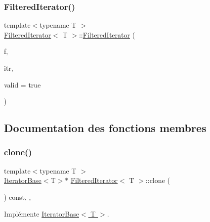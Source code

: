 \subsubsection{\texorpdfstring{Filtered\+Iterator()}{FilteredIterator()}}
{\footnotesize\ttfamily template$<$typename T $>$ \\
\hyperlink{class_filtered_iterator}{Filtered\+Iterator}$<$ T $>$\+::\hyperlink{class_filtered_iterator}{Filtered\+Iterator} (\begin{DoxyParamCaption}\item[{\hyperlink{class_filtered_collection}{Filtered\+Collection}$<$ T $>$ \&}]{f,  }\item[{\hyperlink{class_collection_iterator}{Collection\+Iterator}$<$ T $>$}]{itr,  }\item[{bool}]{valid = {\ttfamily true} }\end{DoxyParamCaption})\hspace{0.3cm}{\ttfamily [inline]}}



\subsection{Documentation des fonctions membres}
\mbox{\label{class_filtered_iterator_a79d512a43aa4d31caf26908e93130b9d}} 
\subsubsection{\texorpdfstring{clone()}{clone()}}
{\footnotesize\ttfamily template$<$typename T $>$ \\
\hyperlink{class_iterator_base}{Iterator\+Base}$<$T$>$$\ast$ \hyperlink{class_filtered_iterator}{Filtered\+Iterator}$<$ T $>$\+::clone (\begin{DoxyParamCaption}{ }\end{DoxyParamCaption}) const\hspace{0.3cm}{\ttfamily [inline]}, {\ttfamily [override]}, {\ttfamily [virtual]}}



Implémente \hyperlink{class_iterator_base_a541fdf8cc48f31c8ddfdc3f319a37100}{Iterator\+Base$<$ T $>$}.

\mbox{\label{class_filtered_iterator_a7118ec2bba2bf138ca771a394a8d72c8}} 
